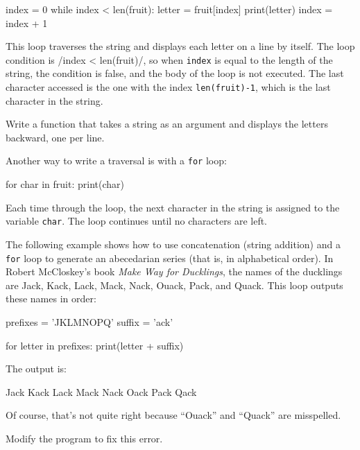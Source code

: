 \beforeverb
\begin{pycode}
index = 0
while index < len(fruit):
    letter = fruit[index]
    print(letter)
    index = index + 1
\end{pycode}
\afterverb
%
This loop traverses the string and displays each letter on a line by
itself.  The loop condition is {\pyinline/index < len(fruit)/}, so
when {\tt index} is equal to the length of the string, the
condition is false, and the body of the loop is not executed.  The
last character accessed is the one with the index {\tt len(fruit)-1},
which is the last character in the string.

\begin{exercise}
Write a function that takes a string as an argument
and displays the letters backward, one per line.
\end{exercise}

Another way to write a traversal is with a {\tt for} loop:

\beforeverb
\begin{pycode}
for char in fruit:
    print(char)
\end{pycode}
\afterverb
%
Each time through the loop, the next character in the string is assigned
to the variable {\tt char}.  The loop continues until no characters are
left.


The following example shows how to use concatenation (string addition)
and a {\tt for} loop to generate an abecedarian series (that is, in
alphabetical order).  In Robert McCloskey's book {\em Make
Way for Ducklings}, the names of the ducklings are Jack, Kack, Lack,
Mack, Nack, Ouack, Pack, and Quack.  This loop outputs these names in
order:

\beforeverb
\begin{pycode}
prefixes = 'JKLMNOPQ'
suffix = 'ack'

for letter in prefixes:
    print(letter + suffix)
\end{pycode}
\afterverb
%
The output is:

\beforeverb
\begin{pyoutput}
Jack
Kack
Lack
Mack
Nack
Oack
Pack
Qack
\end{pyoutput}
\afterverb
%
Of course, that's not quite right because ``Ouack'' and
``Quack'' are misspelled.

\begin{exercise}
Modify the program to fix this error.
\end{exercise}



